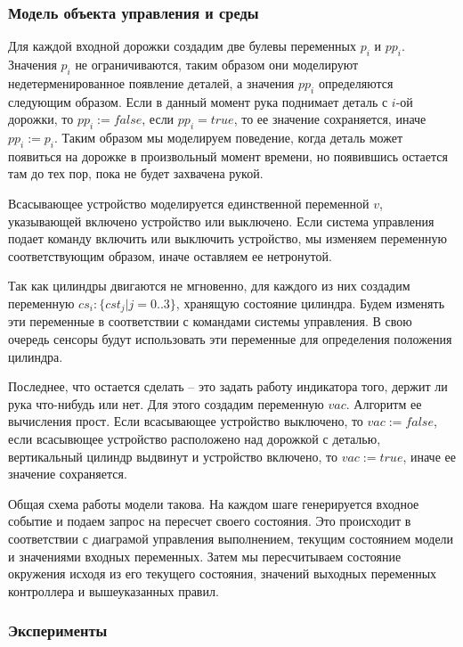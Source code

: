 \documentclass[14pt]{article}
\begin{document}
\subsubsection{Модель объекта управления и среды}

Для каждой входной дорожки создадим две булевы переменных $p_i$ и $pp_i$.
Значения $p_i$ не ограничиваются, таким образом они моделируют
недетерменированное появление деталей, а значения $pp_i$ определяются
следующим образом. Если в данный момент рука поднимает деталь с $i$-ой
дорожки, то $pp_i := false$, если $pp_i = true$, то ее значение сохраняется,
иначе $pp_i := p_i$. Таким образом мы моделируем поведение, когда деталь
может появиться на дорожке в произвольный момент времени, но появившись
остается там до тех пор, пока не будет захвачена рукой.

Всасывающее устройство моделируется единственной переменной $v$, указывающей
включено устройство или выключено. Если система управления подает команду включить
или выключить устройство, мы изменяем переменную соответствующим образом,
иначе оставляем ее нетронутой.

Так как цилиндры двигаются не мгновенно, для каждого из них создадим переменную
$cs_i : \{cst_j | j = 0 .. 3 \}$, хранящую состояние цилиндра. Будем изменять
эти переменные в соответствии с командами системы управления. В свою очередь сенсоры
будут использовать эти переменные для определения положения цилиндра.

Последнее, что остается сделать -- это задать работу индикатора того, держит
ли рука что-нибудь или нет. Для этого создадим переменную $vac$. Алгоритм
ее вычисления прост. Если всасывающее устройство выключено, то
$vac := false$, если всасывющее устройство расположено над дорожкой с деталью,
вертикальный цилиндр выдвинут и устройство включено, то $vac := true$, иначе
ее значение сохраняется.

Общая схема работы модели такова. На каждом шаге генерируется входное событие
и подаем запрос на пересчет своего состояния. Это происходит в соответствии с диаграмой
управления выполнением, текущим состоянием модели и значениями входных
переменных. Затем мы пересчитываем состояние окружения исходя из его текущего
состояния, значений выходных переменных контроллера и вышеуказанных правил.

\subsubsection{Эксперименты}
\end{document}
